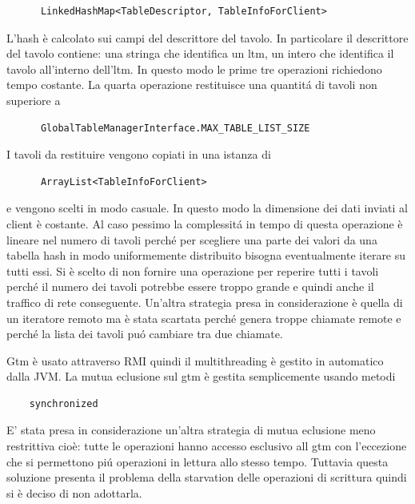 \begin{description}
      	\begin{verbatim}
	  LinkedHashMap<TableDescriptor, TableInfoForClient>
	\end{verbatim}
	L'hash \`e calcolato sui campi del descrittore del tavolo. In particolare il descrittore del tavolo contiene: una stringa che identifica un ltm, un intero che identifica il tavolo all'interno dell'ltm. In questo modo le prime tre operazioni richiedono tempo costante. La quarta operazione restituisce una quantit\'a di tavoli non superiore a
	\begin{verbatim}
	  GlobalTableManagerInterface.MAX_TABLE_LIST_SIZE
	\end{verbatim}
	I tavoli da restituire vengono copiati in una istanza di
	\begin{verbatim}
	  ArrayList<TableInfoForClient>
	\end{verbatim}
	e vengono scelti in modo casuale. In questo modo la dimensione dei dati inviati al client \`e costante. Al caso pessimo la complessit\'a in tempo di questa operazione \`e lineare nel numero di tavoli perch\'e per scegliere una parte dei valori da una tabella hash in modo uniformemente distribuito bisogna eventualmente iterare su tutti essi. Si \`e scelto di non fornire una operazione per reperire tutti i tavoli perch\'e il numero dei tavoli potrebbe essere troppo grande e quindi anche il traffico di rete conseguente. Un'altra strategia presa in considerazione \`e quella di un iteratore remoto ma \`e stata scartata perch\'e genera troppe chiamate remote e perch\'e la lista dei tavoli pu\'o cambiare tra due chiamate.
    \end{description}
  Gtm \`e usato attraverso RMI quindi il multithreading \`e gestito in automatico dalla JVM. La mutua eclusione sul gtm \`e gestita semplicemente usando metodi \begin{verbatim}
    synchronized
  \end{verbatim} 
  E' stata presa in considerazione un'altra strategia di mutua eclusione meno restrittiva cio\`e: tutte le operazioni hanno accesso esclusivo all gtm con l'eccezione che si permettono pi\'u operazioni in lettura allo stesso tempo. Tuttavia questa soluzione presenta il problema della starvation delle operazioni di scrittura quindi si \`e deciso di non adottarla.



